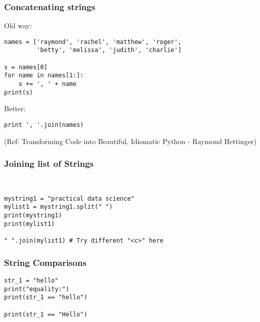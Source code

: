 \begin{frame}[fragile]\frametitle{Concatenating strings}
Old way:

\begin{lstlisting}
names = ['raymond', 'rachel', 'matthew', 'roger',
         'betty', 'melissa', 'judith', 'charlie']

s = names[0]
for name in names[1:]:
    s += ', ' + name
print(s)
\end{lstlisting}
Better:
\begin{lstlisting}
print ', '.join(names)
\end{lstlisting}


\tiny{(Ref: Transforming Code into Beautiful, Idiomatic Python -  Raymond Hettinger)}

\end{frame}


\begin{frame}[fragile]\frametitle{Joining list of Strings}

\begin{lstlisting}


mystring1 = "practical data science"
mylist1 = mystring1.split(" ")
print(mystring1)
print(mylist1)

" ".join(mylist1) # Try different "<c>" here
\end{lstlisting}
\end{frame}

\begin{frame}[fragile]\frametitle{String Comparisons}
\begin{lstlisting}
str_1 = "hello"
print("equality:")
print(str_1 == "hello")

print(str_1 == "Hello")
\end{lstlisting}
\end{frame}




